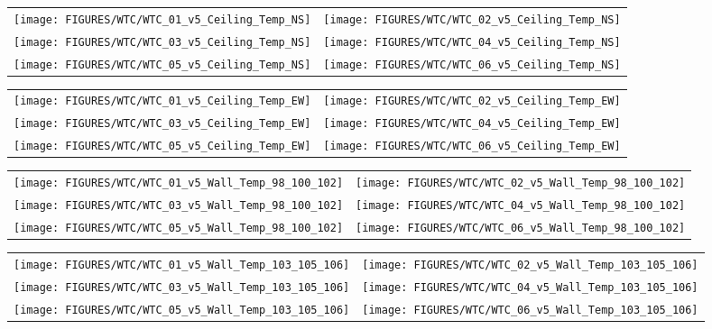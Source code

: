 \begin{figure}[p]
\begin{tabular*}{\textwidth}{l@{\extracolsep{\fill}}r}
\texttt{[image: FIGURES/WTC/WTC\_01\_v5\_Ceiling\_Temp\_NS]} &
\texttt{[image: FIGURES/WTC/WTC\_02\_v5\_Ceiling\_Temp\_NS]} \\
\texttt{[image: FIGURES/WTC/WTC\_03\_v5\_Ceiling\_Temp\_NS]} &
\texttt{[image: FIGURES/WTC/WTC\_04\_v5\_Ceiling\_Temp\_NS]} \\
\texttt{[image: FIGURES/WTC/WTC\_05\_v5\_Ceiling\_Temp\_NS]} &
\texttt{[image: FIGURES/WTC/WTC\_06\_v5\_Ceiling\_Temp\_NS]}
\end{tabular*}
\label{NIST_WTC_Ceiling_NS}
\end{figure}

\begin{figure}[p]
\begin{tabular*}{\textwidth}{l@{\extracolsep{\fill}}r}
\texttt{[image: FIGURES/WTC/WTC\_01\_v5\_Ceiling\_Temp\_EW]} &
\texttt{[image: FIGURES/WTC/WTC\_02\_v5\_Ceiling\_Temp\_EW]} \\
\texttt{[image: FIGURES/WTC/WTC\_03\_v5\_Ceiling\_Temp\_EW]} &
\texttt{[image: FIGURES/WTC/WTC\_04\_v5\_Ceiling\_Temp\_EW]} \\
\texttt{[image: FIGURES/WTC/WTC\_05\_v5\_Ceiling\_Temp\_EW]} &
\texttt{[image: FIGURES/WTC/WTC\_06\_v5\_Ceiling\_Temp\_EW]}
\end{tabular*}
\label{NIST_WTC_Ceiling_EW}
\end{figure}

\begin{figure}[p]
\begin{tabular*}{\textwidth}{l@{\extracolsep{\fill}}r}
\texttt{[image: FIGURES/WTC/WTC\_01\_v5\_Wall\_Temp\_98\_100\_102]} &
\texttt{[image: FIGURES/WTC/WTC\_02\_v5\_Wall\_Temp\_98\_100\_102]} \\
\texttt{[image: FIGURES/WTC/WTC\_03\_v5\_Wall\_Temp\_98\_100\_102]} &
\texttt{[image: FIGURES/WTC/WTC\_04\_v5\_Wall\_Temp\_98\_100\_102]} \\
\texttt{[image: FIGURES/WTC/WTC\_05\_v5\_Wall\_Temp\_98\_100\_102]} &
\texttt{[image: FIGURES/WTC/WTC\_06\_v5\_Wall\_Temp\_98\_100\_102]}
\end{tabular*}
\label{NIST_WTC_Wall_98_100_102}
\end{figure}

\begin{figure}[p]
\begin{tabular*}{\textwidth}{l@{\extracolsep{\fill}}r}
\texttt{[image: FIGURES/WTC/WTC\_01\_v5\_Wall\_Temp\_103\_105\_106]} &
\texttt{[image: FIGURES/WTC/WTC\_02\_v5\_Wall\_Temp\_103\_105\_106]} \\
\texttt{[image: FIGURES/WTC/WTC\_03\_v5\_Wall\_Temp\_103\_105\_106]} &
\texttt{[image: FIGURES/WTC/WTC\_04\_v5\_Wall\_Temp\_103\_105\_106]} \\
\texttt{[image: FIGURES/WTC/WTC\_05\_v5\_Wall\_Temp\_103\_105\_106]} &
\texttt{[image: FIGURES/WTC/WTC\_06\_v5\_Wall\_Temp\_103\_105\_106]}
\end{tabular*}
\label{NIST_WTC_Wall_103_105_106}
\end{figure}

